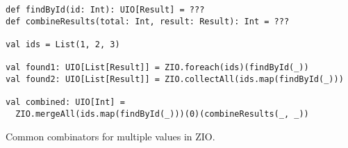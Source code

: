 \begin{algorithm}

\begin{verbatim}
def findById(id: Int): UIO[Result] = ???
def combineResults(total: Int, result: Result): Int = ???

val ids = List(1, 2, 3)

val found1: UIO[List[Result]] = ZIO.foreach(ids)(findById(_))
val found2: UIO[List[Result]] = ZIO.collectAll(ids.map(findById(_)))

val combined: UIO[Int] =
  ZIO.mergeAll(ids.map(findById(_)))(0)(combineResults(_, _))
\end{verbatim}

\caption{Common combinators for multiple values in ZIO. \label{zio:multi-combinators}}
\end{algorithm}